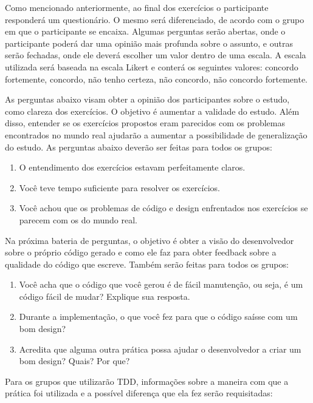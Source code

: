 Como mencionado anteriormente, ao final dos exercícios o participante responderá um questionário. 
O mesmo será diferenciado, de acordo com o grupo em que o participante se encaixa. Algumas
perguntas serão abertas, onde o participante poderá dar uma opinião mais profunda sobre o assunto,
e outras serão fechadas, onde ele deverá escolher um valor dentro de uma escala. A escala utilizada
será baseada na escala Likert e conterá os seguintes valores: concordo fortemente, concordo, não tenho certeza,
não concordo, não concordo fortemente.

As perguntas abaixo visam obter a opinião dos participantes sobre o estudo, como clareza dos
exercícios. O objetivo é aumentar a validade do estudo.
Além disso, entender se os exercícios propostos eram parecidos com os problemas encontrados no mundo
real ajudarão a aumentar a possibilidade de generalização do estudo. As perguntas abaixo deverão
ser feitas para todos os grupos:

\begin{enumerate}
	\item O entendimento dos exercícios estavam perfeitamente claros.
	\item Você teve tempo suficiente para resolver os exercícios.
	\item Você achou que os problemas de código e design enfrentados nos exercícios se parecem com os do mundo real.
\end{enumerate}

Na próxima bateria de perguntas, o objetivo é obter a visão do desenvolvedor sobre o próprio código gerado e como ele
faz para obter feedback sobre a qualidade do código que escreve. Também serão feitas para todos os grupos:

\begin{enumerate}
	\item Você acha que o código que você gerou é de fácil manutenção, ou seja, é um código fácil de mudar? Explique sua resposta.
	\item Durante a implementação, o que você fez para que o código saísse com um bom design?
	\item Acredita que alguma outra prática possa ajudar o desenvolvedor a criar um bom design? Quais? Por que?
\end{enumerate}

Para os grupos que utilizarão TDD, informações sobre a maneira com que a prática foi utilizada e a possível
diferença que ela fez serão requisitadas:

